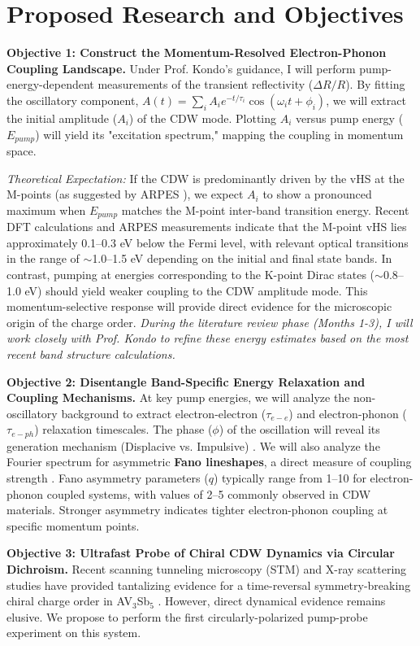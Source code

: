 \documentclass[12pt,a4paper]{article}
\begin{document}
\section{Proposed Research and Objectives}
\textbf{Objective 1: Construct the Momentum-Resolved Electron-Phonon Coupling Landscape.} Under Prof. Kondo's guidance, I will perform pump-energy-dependent measurements of the transient reflectivity ($\Delta R/R$). By fitting the oscillatory component, $A(t) = \sum_{i} A_i e^{-t/\tau_i} \cos(\omega_i t + \phi_i)$, we will extract the initial amplitude ($A_i$) of the CDW mode. Plotting $A_i$ versus pump energy ($E_{pump}$) will yield its "excitation spectrum," mapping the coupling in momentum space.

\textit{Theoretical Expectation:} If the CDW is predominantly driven by the vHS at the M-points (as suggested by ARPES \cite{Kang2022}), we expect $A_i$ to show a pronounced maximum when $E_{pump}$ matches the M-point inter-band transition energy. Recent DFT calculations and ARPES measurements \cite{Tan2021, Zhao2021, Cho2021} indicate that the M-point vHS lies approximately 0.1--0.3 eV below the Fermi level, with relevant optical transitions in the range of $\sim$1.0--1.5 eV depending on the initial and final state bands. In contrast, pumping at energies corresponding to the K-point Dirac states ($\sim$0.8--1.0 eV) should yield weaker coupling to the CDW amplitude mode. This momentum-selective response will provide direct evidence for the microscopic origin of the charge order. \textit{During the literature review phase (Months 1-3), I will work closely with Prof. Kondo to refine these energy estimates based on the most recent band structure calculations.}

\textbf{Objective 2: Disentangle Band-Specific Energy Relaxation and Coupling Mechanisms.} At key pump energies, we will analyze the non-oscillatory background to extract electron-electron ($\tau_{e-e}$) and electron-phonon ($\tau_{e-ph}$) relaxation timescales. The phase ($\phi$) of the oscillation will reveal its generation mechanism (Displacive vs. Impulsive) \cite{Zeiger1992}. We will also analyze the Fourier spectrum for asymmetric \textbf{Fano lineshapes}, a direct measure of coupling strength \cite{Klein1983}. Fano asymmetry parameters ($q$) typically range from 1--10 for electron-phonon coupled systems, with values of 2--5 commonly observed in CDW materials. Stronger asymmetry indicates tighter electron-phonon coupling at specific momentum points.

\textbf{Objective 3: Ultrafast Probe of Chiral CDW Dynamics via Circular Dichroism.} Recent scanning tunneling microscopy (STM) and X-ray scattering studies have provided tantalizing evidence for a time-reversal symmetry-breaking chiral charge order in AV$_3$Sb$_5$ \cite{Jiang2021, Shrestha2023}. However, direct dynamical evidence remains elusive. We propose to perform the first circularly-polarized pump-probe experiment on this system.
\end{document}
